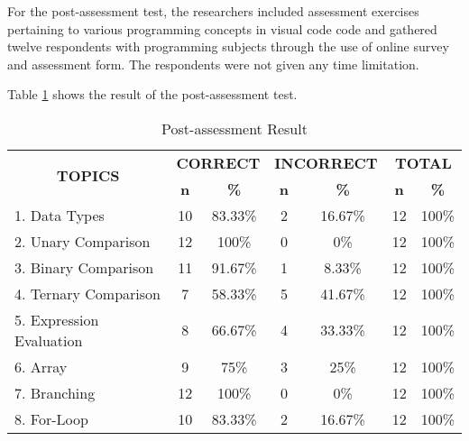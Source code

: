 \parx
For the post-assessment test, the researchers included assessment exercises
pertaining to various programming concepts in visual code code and gathered
twelve respondents with programming subjects through the use of online survey
and assessment form. The respondents were not given any time limitation.

\parx
Table \ref{table:post_result} shows the result of the post-assessment test.

\begin{longtable}[c]{lcccccc}
\caption{Post-assessment Result}
\label{table:post_result}\\ \hline
\multicolumn{1}{c}{\multirow{2}{*}{\textbf{TOPICS}}} & \multicolumn{2}{c}{\textbf{CORRECT}} & \multicolumn{2}{c}{\textbf{INCORRECT}} & \multicolumn{2}{c}{\textbf{TOTAL}} \\
\multicolumn{1}{c}{}                                 & \textbf{n}       & \textbf{\%}       & \textbf{n}        & \textbf{\%}        & \textbf{n}      & \textbf{\%}      \\ \hline
\endfirsthead
%
\endhead
%
1. Data Types                                        & 10               & 83.33\%           & 2                 & 16.67\%            & 12              & 100\%            \\
2. Unary Comparison                                  & 12               & 100\%             & 0                 & 0\%                & 12              & 100\%            \\
3. Binary Comparison                                 & 11               & 91.67\%           & 1                 & 8.33\%             & 12              & 100\%            \\
4. Ternary Comparison                                & 7                & 58.33\%           & 5                 & 41.67\%            & 12              & 100\%            \\
5. Expression Evaluation                             & 8                & 66.67\%           & 4                 & 33.33\%            & 12              & 100\%            \\
6. Array                                             & 9                & 75\%              & 3                 & 25\%               & 12              & 100\%            \\
7. Branching                                         & 12               & 100\%             & 0                 & 0\%                & 12              & 100\%            \\
8. For-Loop                                         & 10               & 83.33\%           & 2                 & 16.67\%            & 12              & 100\%           \\ \hline
\end{longtable}

